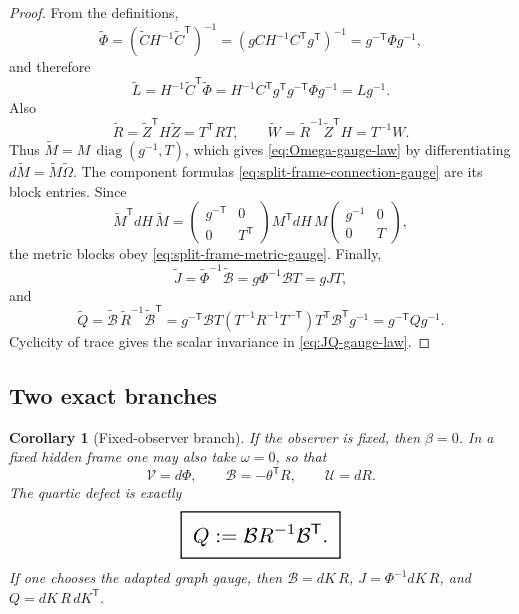 \documentclass[11pt,a4paper]{article}
\numberwithin{equation}{section}
\DeclareMathOperator{\diag}{diag}
\newcommand{\geomboxed}[1]{%
  \setlength{\fboxsep}{8pt}%
  \setlength{\fboxrule}{0.9pt}%
  \fbox{\scalebox{1.5}{$\displaystyle #1$}}%
}
\theoremstyle{thmcompact}
\newtheorem{corollary}[theorem]{Corollary}
\theoremstyle{remark}
\begin{document}
\begin{proof}
From the definitions,
\[
\widetilde\Phi
=
(\widetilde C H^{-1}\widetilde C^{\mathsf T})^{-1}
=
(gC H^{-1}C^{\mathsf T}g^{\mathsf T})^{-1}
=
g^{-\mathsf T}\Phi g^{-1},
\]
and therefore
\[
\widetilde L
=
H^{-1}\widetilde C^{\mathsf T}\widetilde\Phi
=
H^{-1}C^{\mathsf T}g^{\mathsf T}g^{-\mathsf T}\Phi g^{-1}
=
Lg^{-1}.
\]
Also
\[
\widetilde R
=
\widetilde Z^{\mathsf T}H\widetilde Z
=
T^{\mathsf T}RT,
\qquad
\widetilde W
=
\widetilde R^{-1}\widetilde Z^{\mathsf T}H
=
T^{-1}W.
\]
Thus $\widetilde M=M\,\diag(g^{-1},T)$, which gives \eqref{eq:Omega-gauge-law} by differentiating $d\widetilde M=\widetilde M\widetilde\Omega$. The component formulas \eqref{eq:split-frame-connection-gauge} are its block entries. Since
\[
\widetilde M^{\mathsf T}dH\,\widetilde M
=
\begin{pmatrix}
g^{-\mathsf T} & 0\\
0 & T^{\mathsf T}
\end{pmatrix}
M^{\mathsf T}dH\,M
\begin{pmatrix}
g^{-1} & 0\\
0 & T
\end{pmatrix},
\]
the metric blocks obey \eqref{eq:split-frame-metric-gauge}. Finally,
\[
\widetilde J
=
\widetilde\Phi^{-1}\widetilde{\mathcal B}
=
g\Phi^{-1}\mathcal B T
=
gJT,
\]
and
\[
\widetilde Q
=
\widetilde{\mathcal B}\,\widetilde R^{-1}\widetilde{\mathcal B}^{\mathsf T}
=
g^{-\mathsf T}\mathcal B T(T^{-1}R^{-1}T^{-\mathsf T})T^{\mathsf T}\mathcal B^{\mathsf T}g^{-1}
=
g^{-\mathsf T}Qg^{-1}.
\]
Cyclicity of trace gives the scalar invariance in \eqref{eq:JQ-gauge-law}.
\end{proof}

\subsection{Two exact branches}

\begin{corollary}[Fixed-observer branch]
\label{cor:fixed-observer-branch}
If the observer is fixed, then $\beta=0$. In a fixed hidden frame one may also take $\omega=0$, so that
\begin{equation}
\mathcal V=d\Phi,
\qquad
\mathcal B=-\theta^{\mathsf T}R,
\qquad
\mathcal U=dR.
\label{eq:fixed-observer-branch}
\end{equation}
The quartic defect is exactly
\begin{equation}
\geomboxed{
Q:=\mathcal B R^{-1}\mathcal B^{\mathsf T}.
}
\label{eq:Q-fixed-invariant}
\end{equation}
If one chooses the adapted graph gauge, then $\mathcal B=dK\,R$, $J=\Phi^{-1}dK\,R$, and $Q=dK\,R\,dK^{\mathsf T}$.
\end{corollary}
\end{document}

